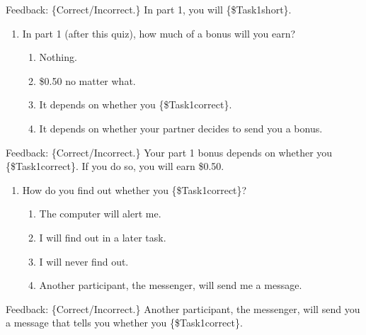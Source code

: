 \begin{description}[listparindent = 1.5em]
Feedback: \{Correct/Incorrect.\} In part 1, you will \{\$Task1short\}.

\item[Part 1 Quiz Question 2] \hspace{1cm}
\begin{enumerate}
\item In part 1 (after this quiz), how much of a bonus will you earn?
\begin{enumerate}
    \item Nothing. 
    \item \$0.50 no matter what. 
    \item It depends on whether you \{\$Task1correct\}.
    \item It depends on whether your partner decides to send you a bonus.
\end{enumerate}
\end{enumerate}

Feedback: \{Correct/Incorrect.\} Your part 1 bonus depends on whether you
\{\$Task1correct\}. If you do so, you will earn \$0.50.

\item[Part 1 Quiz Question 3] \hspace{1cm} 
\begin{enumerate} 
\item How do you find out whether you \{\$Task1correct\}?
\begin{enumerate} 
\item The computer will alert me.
\item I will find out in a later task.
\item I will never find out.
\item Another participant, the messenger, will send me a message.    
\end{enumerate} 
\end{enumerate}

Feedback: \{Correct/Incorrect.\} Another participant, the messenger, will send
you a message that tells you whether you \{\$Task1correct\}.


\end{description}
